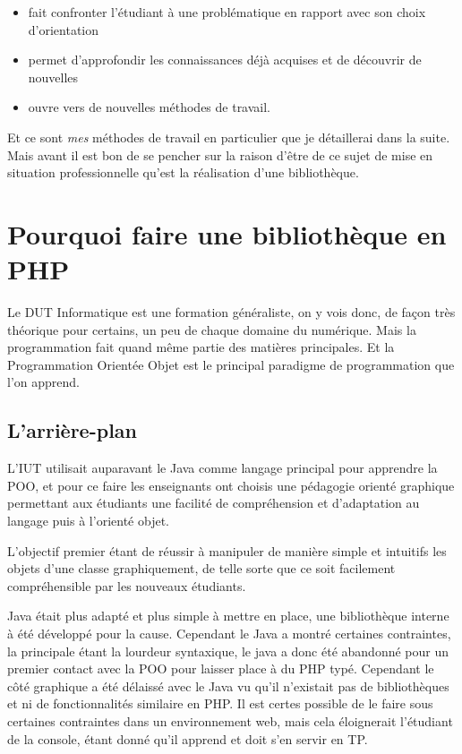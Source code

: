 \documentclass[11pt,a4paper,krantz2,11pt,oneside]{krantz}
\providecommand{\tightlist}{%
  \setlength{\itemsep}{0pt}\setlength{\parskip}{0pt}}
\begin{document}
\begin{itemize}
\tightlist
\item
  fait confronter l'étudiant à une problématique en rapport avec son choix d'orientation
\item
  permet d'approfondir les connaissances déjà acquises et de découvrir de nouvelles
\item
  ouvre vers de nouvelles méthodes de travail.
\end{itemize}

Et ce sont \emph{mes} méthodes de travail en particulier que je détaillerai dans la suite. Mais avant il est bon de se pencher sur la raison d'être de ce sujet de mise en situation professionnelle qu'est la réalisation d'une bibliothèque.

\hypertarget{pourquoi-faire-une-bibliothuxe8que-en-php}{%
\section{Pourquoi faire une bibliothèque en PHP}\label{pourquoi-faire-une-bibliothuxe8que-en-php}}

Le DUT Informatique est une formation généraliste, on y vois donc, de façon très théorique pour certains, un peu de chaque domaine du numérique. Mais la programmation fait quand même partie des matières principales. Et la Programmation Orientée Objet est le principal paradigme de programmation que l'on apprend.

\hypertarget{larriuxe8re-plan}{%
\subsection{L'arrière-plan}\label{larriuxe8re-plan}}

L'IUT utilisait auparavant le Java comme langage principal pour apprendre la POO, et pour ce faire les enseignants ont choisis une pédagogie orienté graphique permettant aux étudiants une facilité de compréhension et d'adaptation au langage puis à l'orienté objet.

L'objectif premier étant de réussir à manipuler de manière simple et intuitifs les objets d'une classe graphiquement, de telle sorte que ce soit facilement compréhensible par les nouveaux étudiants.

Java était plus adapté et plus simple à mettre en place, une bibliothèque interne à été développé pour la cause. Cependant le Java a montré certaines contraintes, la principale étant la lourdeur syntaxique, le java a donc été abandonné pour un premier contact avec la POO pour laisser place à du PHP typé. Cependant le côté graphique a été délaissé avec le Java vu qu'il n'existait pas de bibliothèques et ni de fonctionnalités similaire en PHP. Il est certes possible de le faire sous certaines contraintes dans un environnement web, mais cela éloignerait l'étudiant de la console, étant donné qu'il apprend et doit s'en servir en TP.
\end{document}
